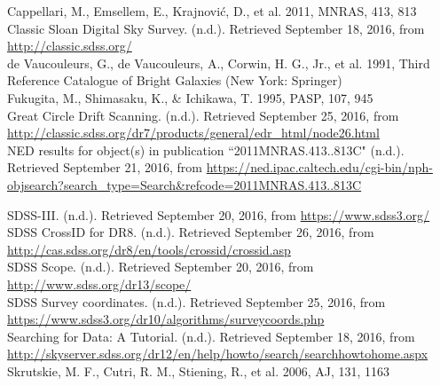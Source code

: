 \documentclass[10pt,letterpaper]{article}
\begin{document}
\newpage
\center
\begin{thebibliography}{1}
 Cappellari, M., Emsellem, E., Krajnovi\'c, D., et al. 2011, MNRAS, 413, 813\\

 Classic Sloan Digital Sky Survey. (n.d.). Retrieved September 18, 2016, from \url{http://classic.sdss.org/}\\

 de Vaucouleurs, G., de Vaucouleurs, A., Corwin, H. G., Jr., et al. 1991, Third
Reference Catalogue of Bright Galaxies (New York: Springer)\\

 Fukugita, M., Shimasaku, K., \& Ichikawa, T. 1995, PASP, 107, 945\\

 Great Circle Drift Scanning. (n.d.). Retrieved September 25, 2016, from \url{http://classic.sdss.org/dr7/products/general/edr_html/node26.html}\\

 NED results for object(s) in publication ``2011MNRAS.413..813C" (n.d.). Retrieved September 21, 2016, from \url{https://ned.ipac.caltech.edu/cgi-bin/nph-objsearch?search_type=Search&refcode=2011MNRAS.413..813C}

 SDSS-III. (n.d.). Retrieved September 20, 2016, from \url{https://www.sdss3.org/}\\

 SDSS CrossID for DR8. (n.d.). Retrieved September 26, 2016, from \url{http://cas.sdss.org/dr8/en/tools/crossid/crossid.asp}\\

 SDSS Scope. (n.d.). Retrieved September 20, 2016, from \url{http://www.sdss.org/dr13/scope/}\\

 SDSS Survey coordinates. (n.d.). Retrieved September 25, 2016, from \url{https://www.sdss3.org/dr10/algorithms/surveycoords.php}\\

 Searching for Data: A Tutorial. (n.d.). Retrieved September 18, 2016, from \url{http://skyserver.sdss.org/dr12/en/help/howto/search/searchhowtohome.aspx}\\

 Skrutskie, M. F., Cutri, R. M., Stiening, R., et al. 2006, AJ, 131, 1163\\


\end{thebibliography}
\end{document}
